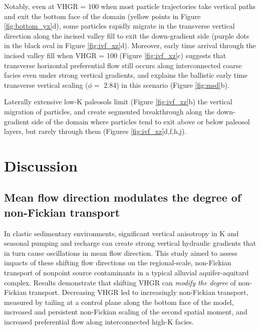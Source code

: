 Notably, even at VHGR = 100 when most particle trajectories take vertical paths and exit the bottom face of the domain (yellow points in Figure \ref{fig:bottom_yx}d), some particles rapidly migrate in the transverse vertical direction along the incised valley fill to exit the down-gradient side (purple dots in the black oval in Figure \ref{fig:ivf_xz}d). Moreover, early time arrival through the incised valley fill when VHGR = 100 (Figure \ref{fig:ivf_xz}c) suggests that transverse horizontal preferential flow still occurs along interconnected coarse facies even under strong vertical gradients, and explains the ballistic early time transverse vertical scaling ($\phi = $ 2.84) in this scenario (Figure \ref{fig:msd}b).

Laterally extensive low-K paleosols limit (Figure \ref{fig:ivf_xz}b) the vertical migration of particles, and create segmented breakthrough along the down-gradient side of the domain where particles tend to exit above or below paleosol layers, but rarely through them (Figures \ref{fig:ivf_xz}d,f,h,j).





\section{Discussion}

%
%
\subsection{Mean flow direction modulates the degree of non-Fickian transport}
\label{ss_4_1}

In clastic sedimentary environments, significant vertical anisotropy in K and seasonal pumping and recharge can create strong vertical hydraulic gradients that in turn cause oscillations in mean flow direction. This study aimed to assess impacts of these shifting flow directions on the regional-scale, non-Fickian transport of nonpoint source contaminants in a typical alluvial aquifer-aquitard complex. Results demonstrate that shifting VHGR can \textit{modify the degree} of non-Fickian transport. Decreasing VHGR led to increasingly non-Fickian transport, measured by tailing at a control plane along the bottom face of the model, increased and persistent non-Fickian scaling of the second spatial moment, and increased preferential flow along interconnected high-K facies. 

